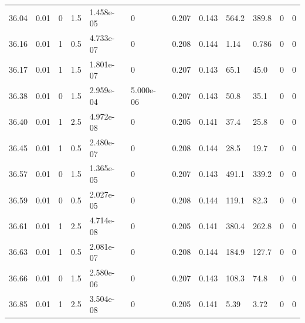 \documentclass[preview]{standalone}
\begin{document}
{{{{{{{{{{{\begin{tabular}{L{1.2cm}C{1.2cm} C{0.3cm}C{0.5cm} C{1.4cm}C{1.4cm} C{1.4cm}C{1.4cm} C{1.6cm}C{1.6cm} C{1.6cm}C{1.6cm}}
  36.04  &  0.01  & 0     & 1.5 &  1.458e-05  & 0  &  0.207&   0.143& 564.2 & 389.8   &  0 & 0  \\ 
  36.16  &  0.01  & 1     & 0.5 &  4.733e-07  & 0  &  0.208&   0.144& 1.14 & 0.786   &  0 & 0  \\ 
  36.17  &  0.01  & 1     & 1.5 &  1.801e-07  & 0  &  0.207&   0.143& 65.1 & 45.0   &  0 & 0  \\ 
  36.38  &  0.01  & 0     & 1.5 &  2.959e-04  & 5.000e-06  &  0.207&   0.143& 50.8 & 35.1   &  0 & 0  \\ 
  36.40  &  0.01  & 1     & 2.5 &  4.972e-08  & 0  &  0.205&   0.141& 37.4 & 25.8   &  0 & 0  \\ 
  36.45  &  0.01  & 1     & 0.5 &  2.480e-07  & 0  &  0.208&   0.144& 28.5 & 19.7   &  0 & 0  \\ 
  36.57  &  0.01  & 0     & 1.5 &  1.365e-05  & 0  &  0.207&   0.143& 491.1 & 339.2   &  0 & 0  \\ 
  36.59  &  0.01  & 0     & 0.5 &  2.027e-05  & 0  &  0.208&   0.144& 119.1 & 82.3   &  0 & 0  \\ 
  36.61  &  0.01  & 1     & 2.5 &  4.714e-08  & 0  &  0.205&   0.141& 380.4 & 262.8   &  0 & 0  \\ 
  36.63  &  0.01  & 1     & 0.5 &  2.081e-07  & 0  &  0.208&   0.144& 184.9 & 127.7   &  0 & 0  \\ 
  36.66  &  0.01  & 0     & 1.5 &  2.580e-06  & 0  &  0.207&   0.143& 108.3 & 74.8   &  0 & 0  \\ 
  36.85  &  0.01  & 1     & 2.5 &  3.504e-08  & 0  &  0.205&   0.141& 5.39 & 3.72   &  0 & 0  \\ 
\hline 
\end{tabular} 

}}}}}}}}}}}
\end{document}
